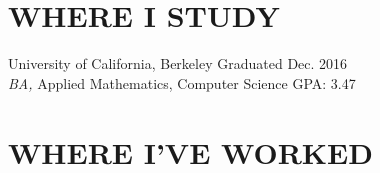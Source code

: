 \documentclass[line,mm]{res}
\begin{document}
\vspace{-5pt}
\address{2520 Hillegass Ave, \#107, Berkeley, CA}
\address{(909)\,348\,3232 allan.p@berkeley.edu}
 
\begin{resume}
 
    \section{WHERE I STUDY} University of California, Berkeley \hfill  Graduated Dec. 2016 \\
    {\sl BA,} Applied Mathematics, Computer Science GPA: 3.47 \hfill 
    
    \section{WHERE I'VE WORKED}
    

\end{resume}
\end{document}
